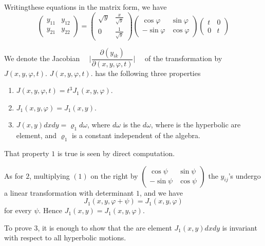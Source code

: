 Writing\pageoriginale these equations in the matrix form, we have 
\begin{equation*}
  \begin{pmatrix}
    y_{11} & y_{12}\\
    y_{21} & y_{22}
  \end{pmatrix}= 
  \begin{pmatrix}
    \sqrt{ y } & \frac{x }{\sqrt{y}}\\ 0 & \frac{1}{\sqrt {y}}
  \end{pmatrix}
  \begin{pmatrix}
    \cos \varphi & \sin \varphi \\ -\sin \varphi & \cos \varphi 
  \end{pmatrix}
  \begin{pmatrix}
    t & 0 \\
    0 & t 
  \end{pmatrix} \tag{1}
\end{equation*}


We denote the Jacobian \ \ $\bigg| \dfrac{\partial (y_{ik})}{\partial ( x,
  y, \varphi, t )}\bigg|$ \ \ of the transformation by\break $J(x,y, \varphi,  t
)$. $J(x,y, \varphi,  t )$. has the following three properties  
\begin{enumerate}
\item $J(x, y, \varphi, t ) = t^3 J_1 (x,  y, \varphi)$. 
\item $J_1 (x,  y, \varphi ) = J_1 (x, y )$. 
\item $J(x,  y ) dx dy = \varrho _1 d \omega$, where $d \omega $ is the $d
  \omega $, where is the hyperbolic are element, and $\varrho_1$ is a
  constant independent of the algebra.  
\end{enumerate}

That property $1$ is true is seen by direct computation.  

As for $2$, multiplying $(1)$ on the right by $ \begin{pmatrix} \cos
  \psi & \sin \psi \\ - \sin \psi & \cos \psi \end{pmatrix}$ the
$y_{ij}$'s undergo a linear transformation with determinant $1$, and
we have  
\begin{equation*}
  J_1 (x,  y, \varphi + \psi ) = J_1 (x, y, \varphi )
\end{equation*}
for every $ \psi$.  Hence  $J_1 (x,  y) = J_1 (x, y, \varphi )$. 

To prove $3$, it is enough to show that the are element $J_1(x, y) dx
dy$ is invariant with respect to all hyperbolic motions.  

